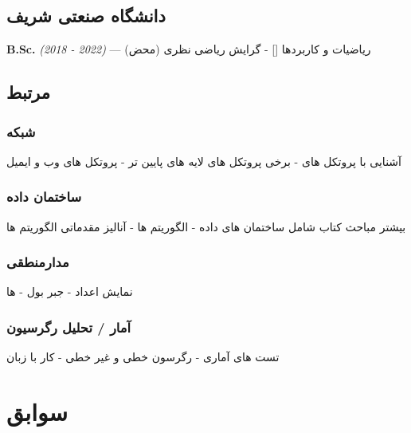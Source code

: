\documentclass{article}
\begin{document}
\subsection{دانشگاه صنعتی شریف}
\textbf{B.Sc.} \textit{(2018 - 2022)} --- ریاضیات و کاربردها
[{\footnotesize {}}] -
گرایش ریاضی نظری (محض)
\subsection{مرتبط}
\subsubsection{شبکه}
آشنایی با پروتکل های  - برخی پروتکل های لایه های پایین تر - پروتکل های وب و ایمیل
\subsubsection{ساختمان داده}
بیشتر مباحث کتاب  شامل ساختمان های داده - الگوریتم ها - آنالیز مقدماتی الگوریتم ها
\subsubsection{مدارمنطقی}
نمایش اعداد - جبر بول - ها
\subsubsection{آمار / تحلیل رگرسیون}
تست های آماری - رگرسون خطی و غیر خطی - کار با زبان 
\section{سوابق}
\end{document}
